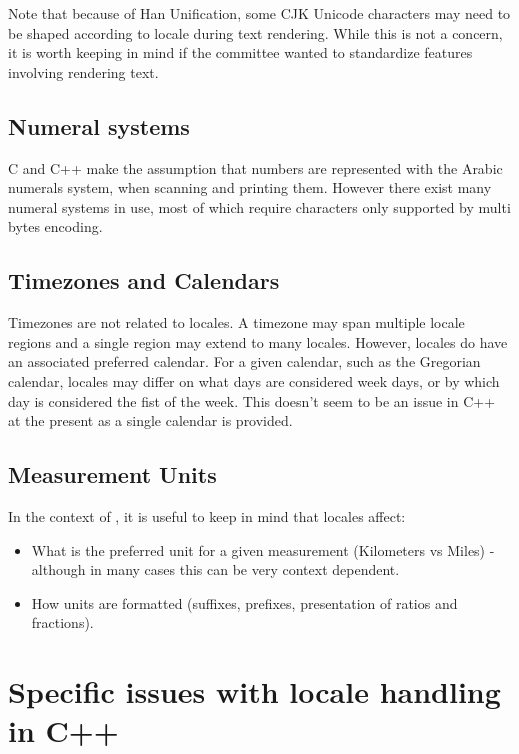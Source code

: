 \documentclass{wg21}
\begin{document}
Note that because of Han Unification, some CJK Unicode characters may need to be shaped according to locale during text rendering.
While this is not a concern, it is worth keeping in mind if the committee wanted to standardize features involving rendering text.

\subsection{Numeral systems}

C and C++ make the assumption that numbers are represented with the Arabic numerals system, when scanning and printing them.
However there exist many numeral systems in use, most of which require characters only supported by multi bytes encoding.

\subsection{Timezones and Calendars}

Timezones are not related to locales. A timezone may span multiple locale regions and a single region may extend to many locales.
However, locales do have an associated preferred calendar.
For a given calendar, such as the Gregorian calendar, locales may differ on what days are considered week days, or by which day is considered the fist of the week.
This doesn't seem to be an issue in C++ at the present as a single calendar is provided.

\subsection{Measurement Units}

In the context of \cite{P1935R1}, it is useful to keep in mind that locales affect:

\begin{itemize}
\item What is the preferred unit for a given measurement (Kilometers vs Miles) - although in many cases this can be very context dependent.
\item How units are formatted (suffixes, prefixes, presentation of ratios and fractions). 
\end{itemize}

\section{Specific issues with locale handling in C++}
\end{document}
